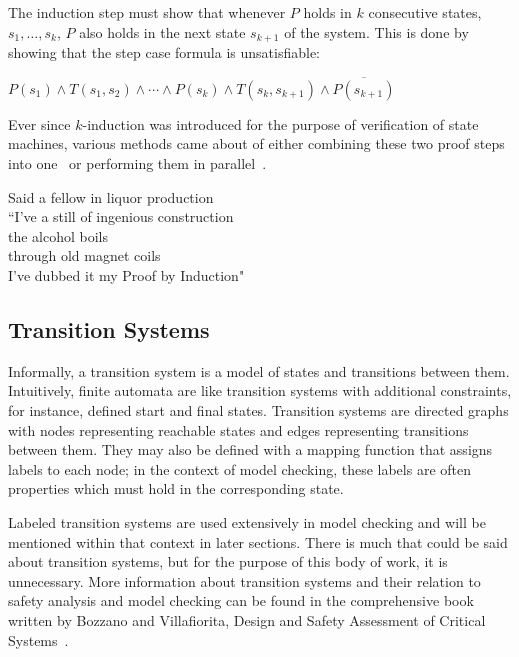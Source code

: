 The induction step must show that whenever $P$ holds in $k$ consecutive states, $s_1, \ldots, s_k$, $P$ also holds in the next state $s_{k+1}$ of the system. This is done by showing that the step case formula is unsatisfiable:

\begin{center}
$P(s_1) \land T(s_1, s_2) \land \cdots \land P(s_k) \land T(s_{k}, s_{k+1}) \land \overline{P(s_{k+1})}$
\end{center}

Ever since $k$-induction was introduced for the purpose of verification of state machines, various methods came about of either combining these two proof steps into one~\cite{donaldson2011software} or performing them in parallel~\cite{kahsai2011pkind}. 

\noindent Said a fellow in liquor production\\
``I’ve a still of ingenious construction\\
the alcohol boils\\
through old magnet coils\\
I’ve dubbed it my Proof by Induction"

\subsection{Transition Systems}
Informally, a transition system is a model of states and transitions between them. Intuitively, finite automata are like transition systems with additional constraints, for instance, defined start and final states. Transition systems are directed graphs with nodes representing reachable states and edges representing transitions between them. They may also be defined with a mapping function that assigns labels to each node; in the context of model checking, these labels are often properties which must hold in the corresponding state.

Labeled transition systems are used extensively in model checking and will be mentioned within that context in later sections. There is much that could be said about transition systems, but for the purpose of this body of work, it is unnecessary. More information about transition systems and their relation to safety analysis and model checking can be found in the comprehensive book written by Bozzano and Villafiorita, Design and Safety Assessment of Critical Systems~\cite{Bozzano:2010:DSA:1951720}.

